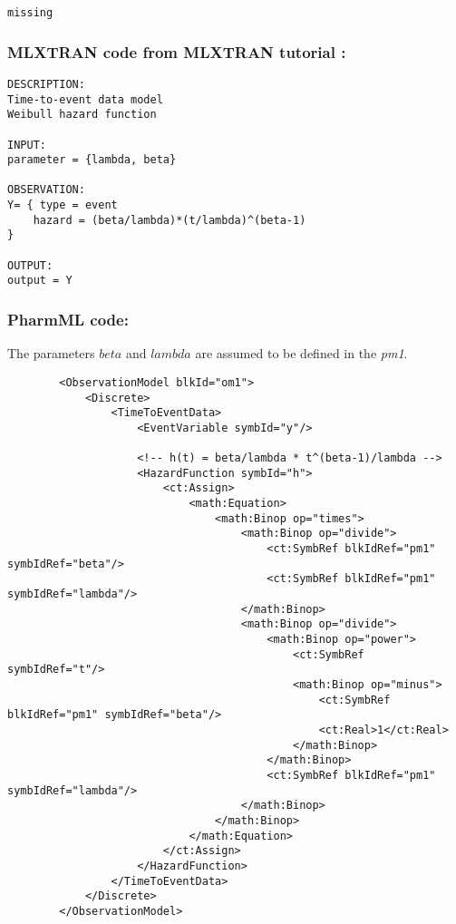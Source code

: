 \myStartLine

\lstset{language=NONMEMdataSet}
\begin{lstlisting}
missing
\end{lstlisting}
\myEndLine

\subsubsection{MLXTRAN code from MLXTRAN tutorial \cite{Monolix4.3Tutorial:2014}:}

\myStartLine
\lstset{language=MLXTRANcode}
\begin{lstlisting}
DESCRIPTION:
Time-to-event data model 
Weibull hazard function

INPUT:
parameter = {lambda, beta}

OBSERVATION:
Y= { type = event 
    hazard = (beta/lambda)*(t/lambda)^(beta-1) 
}

OUTPUT:
output = Y
\end{lstlisting}
\myEndLine

\subsubsection{PharmML code:}
The parameters $beta$ and $lambda$ are assumed to be defined in the  \emph{pm1}.

\lstset{language=XML}
\begin{lstlisting}
        <ObservationModel blkId="om1">
            <Discrete>
                <TimeToEventData>
                    <EventVariable symbId="y"/>
                    
                    <!-- h(t) = beta/lambda * t^(beta-1)/lambda -->
                    <HazardFunction symbId="h">
                        <ct:Assign>
                            <math:Equation>
                                <math:Binop op="times">
                                    <math:Binop op="divide">
                                        <ct:SymbRef blkIdRef="pm1" symbIdRef="beta"/>
                                        <ct:SymbRef blkIdRef="pm1" symbIdRef="lambda"/>
                                    </math:Binop>
                                    <math:Binop op="divide">
                                        <math:Binop op="power">
                                            <ct:SymbRef symbIdRef="t"/>
                                            <math:Binop op="minus">
                                                <ct:SymbRef blkIdRef="pm1" symbIdRef="beta"/>
                                                <ct:Real>1</ct:Real>
                                            </math:Binop>
                                        </math:Binop>
                                        <ct:SymbRef blkIdRef="pm1" symbIdRef="lambda"/>
                                    </math:Binop>
                                </math:Binop>
                            </math:Equation>
                        </ct:Assign>   
                    </HazardFunction>
                </TimeToEventData>
            </Discrete>
        </ObservationModel>
\end{lstlisting}


